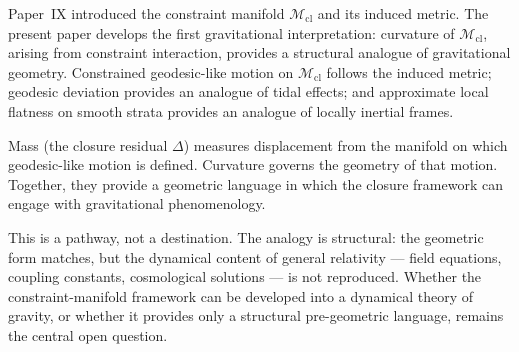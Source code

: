 \documentclass[12pt]{article}
\newcommand{\Mcl}{\mathcal{M}_{\mathrm{cl}}}
\begin{document}
Paper~IX introduced the constraint manifold $\Mcl$ and its induced metric. The present paper develops the first gravitational interpretation: curvature of $\Mcl$, arising from constraint interaction, provides a structural analogue of gravitational geometry. Constrained geodesic-like motion on $\Mcl$ follows the induced metric; geodesic deviation provides an analogue of tidal effects; and approximate local flatness on smooth strata provides an analogue of locally inertial frames.

Mass (the closure residual $\Delta$) measures displacement from the manifold on which geodesic-like motion is defined. Curvature governs the geometry of that motion. Together, they provide a geometric language in which the closure framework can engage with gravitational phenomenology.

This is a pathway, not a destination. The analogy is structural: the geometric form matches, but the dynamical content of general relativity --- field equations, coupling constants, cosmological solutions --- is not reproduced. Whether the constraint-manifold framework can be developed into a dynamical theory of gravity, or whether it provides only a structural pre-geometric language, remains the central open question.



\end{document}
